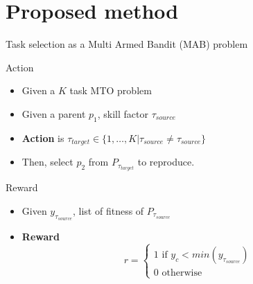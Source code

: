 \section{Proposed method}

\begin{frame}{Task selection as a Multi Armed Bandit (MAB) problem}
    \begin{block}{Action}
        \begin{itemize}
            \item Given a $K$ task MTO problem
            \item Given a parent $p_1$, skill factor $\tau_{source}$
            \item \textbf{Action} is $\tau_{target} \in \{1, \ldots, K | \tau_{source} \ne \tau_{source}
            \}$
            \item Then, select $p_2$ from $P_{\tau_{target}}$ to reproduce.
        \end{itemize}
    \end{block}
    \begin{block}{Reward}
        \begin{itemize}
            \item Given $y_{\tau_{source}}$, list of fitness of $P_{\tau_{source}}$
            \item \textbf{Reward}
                \begin{equation}
                    r = \left\{
                        \begin{array}{ll}
                            1 \text{ if } y_c < min(y_{\tau_{source}}) \\
                            0 \text{ otherwise }
                        \end{array}
                    \right.
                \end{equation}
        \end{itemize}
    \end{block}
\end{frame}

